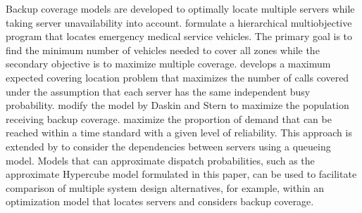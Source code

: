 \documentclass[11pt]{article}\topmargin 0mm
\begin{document}
{\color{blue}
Backup coverage models are developed to optimally locate multiple servers while taking server unavailability into account. \citet{daskin1981hierarchical} formulate a hierarchical multiobjective program that locates emergency medical service vehicles. The primary goal is to find the minimum number of vehicles needed to cover all zones while the secondary objective is to maximize multiple coverage. \citet{daskin1983maximum} develops a maximum expected covering location problem that maximizes the number of calls covered under the assumption that each server has the same independent busy probability. \citet{hogan1986concepts} modify the model by Daskin and Stern to maximize the population receiving backup coverage. \citet{revelle1989maximum} maximize the proportion of demand that can be reached within a time standard with a given level of reliability. This approach is extended by \citet{MarianovRevelle96} to consider the dependencies between servers using a queueing model. Models that can approximate dispatch probabilities, such as the approximate Hypercube model formulated in this paper, can be used to facilitate comparison of multiple system design alternatives, for example, within an optimization model that locates servers and considers backup coverage.}



\end{document}
